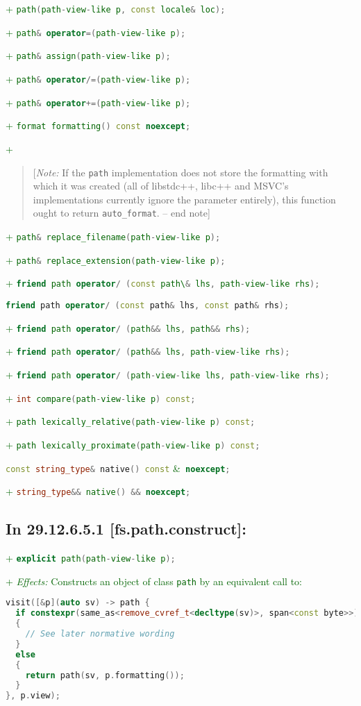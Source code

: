 \documentclass[11pt]{article}
\newcommand{\code}[2][cpp]{\lstinline[language=#1,basicstyle=\small\ttfamily]{#2}}
\newcommand{\desc}[1]{\textit{#1}}
\newcommand{\effects}{\desc{Effects: }}
\newcommand{\note}[1]{\begin{quote}[\textit{Note:} #1 -- end note]\end{quote}}
\newcommand{\tsref}[2]{\subsection*{In #2 \textbf{[#1]}:}}
\newcommand{\tsreplace}[3]{\textcolor{red}{\sout{#1}}#2\textcolor{darkgreen}{#3}}
\begin{document}
\tsreplace{}{}{+ \code{path(path-view-like p, const locale& loc);}}

\tsreplace{}{}{+ \code{path& operator=(path-view-like p);}}

\tsreplace{}{}{+ \code{path& assign(path-view-like p);}}

\tsreplace{}{}{+ \code{path& operator/=(path-view-like p);}}

\tsreplace{}{}{+ \code{path& operator+=(path-view-like p);}}

\tsreplace{}{}{+ \code{format formatting() const noexcept;}}

\tsreplace{}{}{+ \note{If the \code{path} implementation does not store the formatting with which it was created (all of libstdc++, libc++ and MSVC's implementations currently ignore the parameter entirely), this function ought to return \code{auto_format}.}}

\tsreplace{}{}{+ \code{path& replace_filename(path-view-like p);}}

\tsreplace{}{}{+ \code{path& replace_extension(path-view-like p);}}

\tsreplace{}{}{+ \code{friend path operator/ (const path\& lhs, path-view-like rhs);}}

\code{friend path operator/ (const path& lhs, const path& rhs);}

\tsreplace{}{}{+ \code{friend path operator/ (path&& lhs, path&& rhs);}}

\tsreplace{}{}{+ \code{friend path operator/ (path&& lhs, path-view-like rhs);}}

\tsreplace{}{}{+ \code{friend path operator/ (path-view-like lhs, path-view-like rhs);}}

\tsreplace{}{}{+ \code{int compare(path-view-like p) const;}}

\tsreplace{}{}{+ \code{path lexically_relative(path-view-like p) const;}}

\tsreplace{}{}{+ \code{path lexically_proximate(path-view-like p) const;}}

\code{const string_type& native() const} \tsreplace{}{}{\&}\code{ noexcept;}

\tsreplace{}{}{+ \code{string_type&& native() && noexcept;}}


\tsref{fs.path.construct}{29.12.6.5.1}

\tsreplace{}{}{+ \code{explicit path(path-view-like p);}}

\tsreplace{}{}{+ \effects Constructs an object of class \code{path} by an equivalent call to:}
\begin{lstlisting}[language=cpp]
visit([&p](auto sv) -> path {
  if constexpr(same_as<remove_cvref_t<decltype(sv)>, span<const byte>>)
  {
    // See later normative wording
  }
  else
  {
    return path(sv, p.formatting());
  }
}, p.view);
\end{lstlisting}
\end{document}
